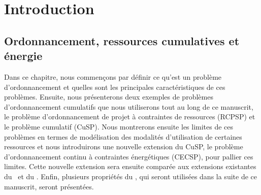 \cleardoublepage
\begin{minipage}{0.95\linewidth}
  \part{Introduction}
  \vspace{15mm} %
  \parttoc 
\end{minipage}

\chapter{Ordonnancement, ressources cumulatives et énergie}

Dans ce chapitre, nous commençons par définir ce qu'est un problème
d'ordonnancement et quelles sont les principales caractéristiques de
ces problèmes. Ensuite, nous présenterons deux exemples de problèmes
d'ordonnancement cumulatifs que nous utiliserons tout au long de ce
manuscrit, le problème d'ordonnancement de projet à contraintes de
ressources (RCPSP) et le problème cumulatif (CuSP). Nous montrerons
ensuite les limites de ces problèmes en termes de modélisation des
modalités d'utilisation de certaines ressources et nous introduirons une nouvelle 
extension du CuSP, le problème d'ordonnancement continu à contraintes
énergétiques (CECSP), pour pallier ces limites. Cette nouvelle
extension sera ensuite comparée aux extensions existantes du \RCPSP~et
du \CUSP.  Enfin, plusieurs propriétés du \CECSP, qui seront utilisées
dans la suite de ce manuscrit, seront présentées.





